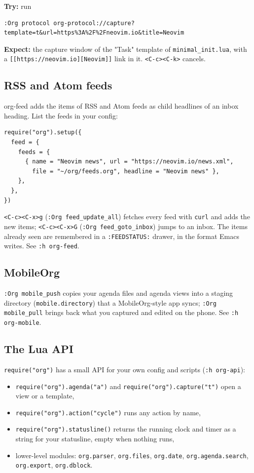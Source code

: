 \textbf{Try:} run
\begin{verbatim}
:Org protocol org-protocol://capture?template=t&url=https%3A%2F%2Fneovim.io&title=Neovim
\end{verbatim}
\textbf{Expect:} the capture window of the "Task" template of
\texttt{minimal\_init.lua}, with a \texttt{[[https://neovim.io][Neovim]]} link in it.
\texttt{<C-c><C-k>} cancels.
\subsection{RSS and Atom feeds}
\label{sec:org53d342f}
org-feed adds the items of RSS and Atom feeds as child headlines of an
inbox heading. List the feeds in your config:

\begin{verbatim}
require("org").setup({
  feed = {
    feeds = {
      { name = "Neovim news", url = "https://neovim.io/news.xml",
        file = "~/org/feeds.org", headline = "Neovim news" },
    },
  },
})
\end{verbatim}

\texttt{<C-c><C-x>g} (\texttt{:Org feed\_update\_all}) fetches every feed with \texttt{curl}
and adds the new items; \texttt{<C-c><C-x>G} (\texttt{:Org feed\_goto\_inbox}) jumps to
an inbox. The items already seen are remembered in a \texttt{:FEEDSTATUS:}
drawer, in the format Emacs writes. See \texttt{:h org-feed}.
\subsection{MobileOrg}
\label{sec:org6669e35}
\texttt{:Org mobile\_push} copies your agenda files and agenda views into a
staging directory (\texttt{mobile.directory}) that a MobileOrg-style app syncs;
\texttt{:Org mobile\_pull} brings back what you captured and edited on the phone.
See \texttt{:h org-mobile}.
\subsection{The Lua API}
\label{sec:orge3c0000}
\texttt{require("org")} has a small API for your own config and scripts
(\texttt{:h org-api}):

\begin{itemize}
\item \texttt{require("org").agenda("a")} and \texttt{require("org").capture("t")} open a
view or a template,
\item \texttt{require("org").action("cycle")} runs any action by name,
\item \texttt{require("org").statusline()} returns the running clock and timer as a
string for your statusline, empty when nothing runs,
\item lower-level modules: \texttt{org.parser}, \texttt{org.files}, \texttt{org.date},
\texttt{org.agenda.search}, \texttt{org.export}, \texttt{org.dblock}.
\end{itemize}

